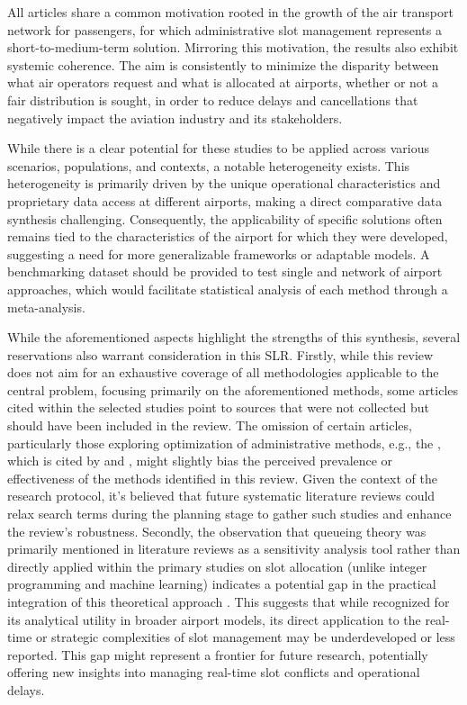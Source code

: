 All articles share a common motivation rooted in the growth of the air transport network for passengers, for which administrative slot management represents a short-to-medium-term solution. Mirroring this motivation, the results also exhibit systemic coherence. The aim is consistently to minimize the disparity between what air operators request and what is allocated at airports, whether or not a fair distribution is sought, in order to reduce delays and cancellations that negatively impact the aviation industry and its stakeholders.

While there is a clear potential for these studies to be applied across various scenarios, populations, and contexts, a notable heterogeneity exists. This heterogeneity is primarily driven by the unique operational characteristics and proprietary data access at different airports, making a direct comparative data synthesis challenging. Consequently, the applicability of specific solutions often remains tied to the characteristics of the airport for which they were developed, suggesting a need for more generalizable frameworks or adaptable models. A benchmarking dataset should be provided to test single and network of airport approaches, which would facilitate statistical analysis of each method through a meta-analysis.  

While the aforementioned aspects highlight the strengths of this synthesis, several reservations also warrant consideration in this \acrshort{SLR}. Firstly, while this review does not aim for an exhaustive coverage of all methodologies applicable to the central problem, focusing primarily on the aforementioned methods, some articles cited within the selected studies point to sources that were not collected but should have been included in the review. The omission of certain articles, particularly those exploring optimization of administrative methods, e.g., the , which is cited by  and , might slightly bias the perceived prevalence or effectiveness of the methods identified in this review. Given the context of the research protocol, it's believed that future systematic literature reviews could relax search terms during the planning stage to gather such studies and enhance the review's robustness. Secondly, the observation that queueing theory was primarily mentioned in literature reviews as a sensitivity analysis tool rather than directly applied within the primary studies on slot allocation (unlike integer programming and machine learning) indicates a potential gap in the practical integration of this theoretical approach \cite{gillen2016airport}. This suggests that while recognized for its analytical utility in broader airport models, its direct application to the real-time or strategic complexities of slot management may be underdeveloped or less reported. This gap might represent a frontier for future research, potentially offering new insights into managing real-time slot conflicts and operational delays. 

